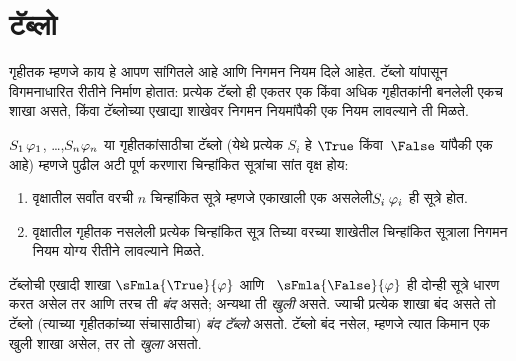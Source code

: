 \section{टॅब्लो}\label{fol:tab:der:sec}

\begin{explain}
गृहीतक म्हणजे काय हे आपण सांगितले आहे आणि निगमन नियम दिले आहेत.
टॅब्लो यांपासून विगमनाधारित रीतीने निर्माण होतात: प्रत्येक
टॅब्लो ही एकतर एक किंवा अधिक गृहीतकांनी बनलेली एकच शाखा असते, किंवा
टॅब्लोच्या एखाद्या शाखेवर निगमन नियमांपैकी एक नियम लावल्याने ती मिळते.
\end{explain}

\begin{defn}[टॅब्लो]
$\sFmlaWide{S_1}{\varphi_1}$, \dots,\linebreak $\sFmlaWide{S_n}{\varphi_n}$ या गृहीतकांसाठीचा
टॅब्लो (येथे प्रत्येक $S_i$ हे $\True$ किंवा~$\False$ यांपैकी एक
आहे) म्हणजे पुढील अटी पूर्ण करणारा चिन्हांकित सूत्रांचा सांत वृक्ष होय:
\begin{enumerate}
\item वृक्षातील सर्वांत वरची $n$ चिन्हांकित सूत्रे म्हणजे एकाखाली एक
  असलेली\linebreak $\sFmlaWide{S_i}{\varphi_i}$ ही सूत्रे होत.
\item वृक्षातील गृहीतक नसलेली प्रत्येक चिन्हांकित सूत्र तिच्या वरच्या
  शाखेतील चिन्हांकित सूत्राला निगमन नियम योग्य रीतीने लावल्याने मिळते.
\end{enumerate}
टॅब्लोची एखादी शाखा $\sFmla{\True}{\varphi}$ आणि
~$\sFmla{\False}{\varphi}$ ही दोन्ही सूत्रे धारण करत असेल तर आणि तरच ती
\emph{बंद} असते; अन्यथा ती \emph{खुली} असते. ज्याची प्रत्येक शाखा बंद
असते तो टॅब्लो (त्याच्या गृहीतकांच्या संचासाठीचा)
\emph{बंद टॅब्लो} असतो. टॅब्लो बंद नसेल, म्हणजे त्यात किमान
एक खुली शाखा असेल, तर तो \emph{खुला} असतो.
\end{defn}

